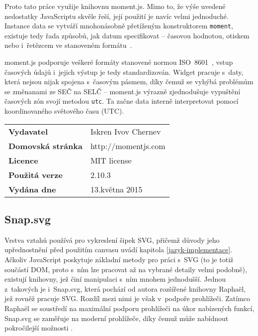 			Proto tato práce využije knihovnu {\sf moment.js}. Mimo to, že výše uvedené nedostatky JavaScriptu skvěle řeší, její použití je navíc velmi jednoduché. Instance data se vytváří mnohonásobně přetíženým konstruktorem {\tt moment}, existuje tedy řada způsobů, jak datum specifikovat -- časovou hodnotou, otiskem nebo i~řetězcem ve stanoveném formátu~\cite{techrep-2013}.
			
			{\sf moment.js} podporuje veškeré formáty stanovené normou ISO~8601~\cite{iso-8601, moment-doc}, vstup časových údajů i~jejich výstup je tedy standardizován. Widget pracuje s~daty, která nejsou nijak spojena s~časovým pásmem, díky čemuž se vyhýbá problémům se změnanami ze SEČ na SELČ -- {\sf moment.js} výrazně zjednodušuje vypuštění časových zón svojí metodou {\tt utc}. Ta začne data interně interpretovat pomocí koordinovaného světového času (UTC).
		
			\vspace{\baselineskip}
			\renewcommand{\arraystretch}{1.3}
			\noindent
			\begin{tabularx}{\textwidth}{|lX|}
			\hline
			\bf Vydavatel & Iskren Ivov Chernev \\
			\bf Domovská stránka & http://momentjs.com\\
			\bf Licence & MIT license \\
			\bf Použitá verze & 2.10.3\\
			\bf Vydána dne & 13.\ts května 2015\\
			\hline
			\end{tabularx}
			
		\subsection{\sf Snap.svg}
		Vrstva vztahů používá pro vykreslení šipek SVG, přičemž důvody jeho upřednost\-nění před použitím canvasu uvádí kapitola \ref{jazyk-implementace}. Ačkoliv JavaScript poskytuje základní metody pro práci s~SVG (to je totiž součástí DOM, proto s~ním lze pracovat až na vybrané detaily velmi podobně), existují knihovny, jež činí manipulaci s~ním mnohem jednodušší. Jednou z~takových je i~{\sf Snap.svg}, která pochází od autora rozšířené knihovny {\sf Raphaël}, jež rovněž pracuje SVG. Rozdíl mezi nimi je však v~podpoře prohlížeči. Zatímco {\sf Raphaël} se soustředí na maximální podporu prohlížeči na úkor nabízených funkcí, {\sf Snap.svg} se zaměřuje na moderní prohlížeče, díky čemuž může nabídnout pokročilejší možnosti \cite{snapsvg-why}.
				
